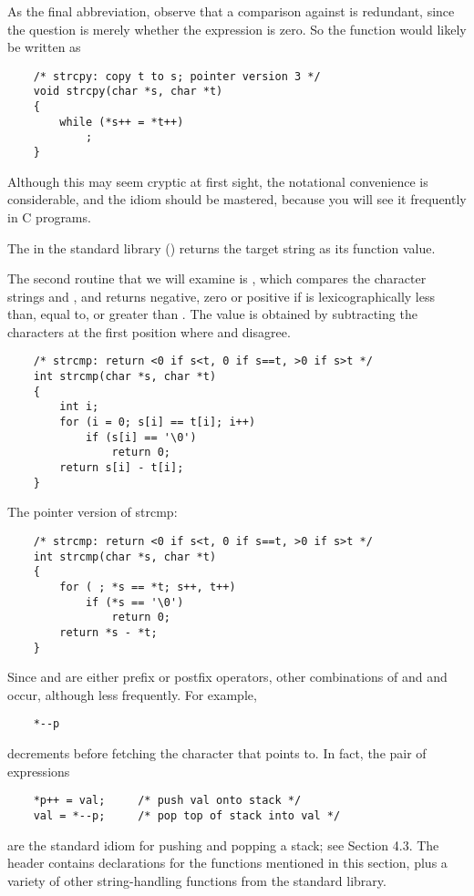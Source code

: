 As the final abbreviation, observe that a comparison against  is redundant, since the question is merely whether the expression is zero. So the function would likely be written as

\begin{lstlisting}
    /* strcpy: copy t to s; pointer version 3 */
    void strcpy(char *s, char *t)
    {
        while (*s++ = *t++)
            ;
    }
\end{lstlisting}

Although this may seem cryptic at first sight, the notational convenience is considerable, and the idiom should be mastered, because you will see it frequently in C programs.

The  in the standard library () returns the target string as its function value.

The second routine that we will examine is , which compares the character strings  and , and returns negative, zero or positive if  is lexicographically less than, equal to, or greater than .
The value is obtained by subtracting the characters at the first position where  and  disagree.

\begin{lstlisting}
    /* strcmp: return <0 if s<t, 0 if s==t, >0 if s>t */
    int strcmp(char *s, char *t)
    {
        int i;
        for (i = 0; s[i] == t[i]; i++)
            if (s[i] == '\0')
                return 0;
        return s[i] - t[i];
    }
\end{lstlisting}

The pointer version of strcmp:

\begin{lstlisting}
    /* strcmp: return <0 if s<t, 0 if s==t, >0 if s>t */
    int strcmp(char *s, char *t)
    {
        for ( ; *s == *t; s++, t++)
            if (*s == '\0')
                return 0;
        return *s - *t;
    }
\end{lstlisting}

Since \code{++} and \code{--} are either prefix or postfix operators, other combinations of \code{*}and \code{++} and \code{--} occur, although less frequently. For example,
\begin{lstlisting}
    *--p
\end{lstlisting}
decrements  before fetching the character that  points to. In fact, the pair of expressions
\begin{lstlisting}
    *p++ = val;     /* push val onto stack */
    val = *--p;     /* pop top of stack into val */
\end{lstlisting}
are the standard idiom for pushing and popping a stack; see Section 4.3.
The header  contains declarations for the functions mentioned in this section, plus a variety of other string-handling functions from the standard library.
\newline

